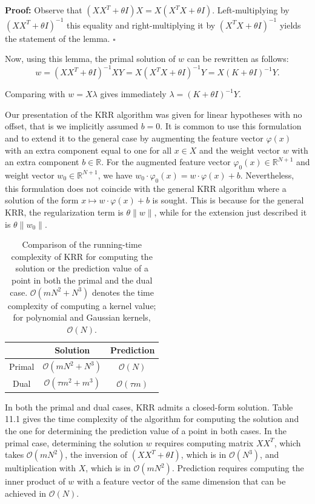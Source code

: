 \documentclass[fleqn,10pt]{olplainarticle}
\begin{document}
\textbf{Proof:} Observe that \((XX^T + \theta I)X = X(X^TX + \theta I)\). Left-multiplying by \((XX^T + \theta I)^{-1}\) this equality and right-multiplying it by \((X^TX + \theta I)^{-1}\) yields the statement of the lemma. \(\square\)

Now, using this lemma, the primal solution of \(w\) can be rewritten as follows:
\[
w = (XX^T + \theta I)^{-1}XY = X(X^TX + \theta I)^{-1}Y = X(K + \theta I)^{-1}Y. \tag{11.21}
\]

Comparing with \(w = X\lambda\) gives immediately \(\lambda = (K + \theta I)^{-1}Y\).

Our presentation of the KRR algorithm was given for linear hypotheses with no offset, that is we implicitly assumed \(b = 0\). It is common to use this formulation and to extend it to the general case by augmenting the feature vector \(\varphi(x)\) with an extra component equal to one for all \(x \in X\) and the weight vector \(w\) with an extra component \(b \in \mathbb{R}\). For the augmented feature vector \(\varphi_0(x) \in \mathbb{R}^{N+1}\) and weight vector \(w_0 \in \mathbb{R}^{N+1}\), we have \(w_0 \cdot \varphi_0(x) = w \cdot \varphi(x) + b\). Nevertheless, this formulation does not coincide with the general KRR algorithm where a solution of the form \(x \mapsto w \cdot \varphi(x) + b\) is sought. This is because for the general KRR, the regularization term is \(\theta \lVert w \rVert\), while for the extension just described it is \(\theta \lVert w_0 \rVert\).

\begin{table}[h]
    \centering
    \caption{Comparison of the running-time complexity of KRR for computing the solution or the prediction value of a point in both the primal and the dual case. $\mathcal{O}(mN^2 + N^3)$ denotes the time complexity of computing a kernel value; for polynomial and Gaussian kernels, $\mathcal{O}(N)$.}
    \begin{tabular}{|c|c|c|}
        \hline
        & Solution & Prediction \\
        \hline
        Primal & $\mathcal{O}(mN^2 + N^3)$ & $\mathcal{O}(N)$ \\
        \hline
        Dual & $\mathcal{O}(\tau m^2 + m^3)$ & $\mathcal{O}(\tau m)$ \\
        \hline
    \end{tabular}
\end{table}

In both the primal and dual cases, KRR admits a closed-form solution. Table 11.1 gives the time complexity of the algorithm for computing the solution and the one for determining the prediction value of a point in both cases. In the primal case, determining the solution \(w\) requires computing matrix \(XX^T\), which takes \(\mathcal{O}(mN^2)\), the inversion of \((XX^T + \theta I)\), which is in \(\mathcal{O}(N^3)\), and multiplication with \(X\), which is in \(\mathcal{O}(mN^2)\). Prediction requires computing the inner product of \(w\) with a feature vector of the same dimension that can be achieved in \(\mathcal{O}(N)\).
\end{document}
